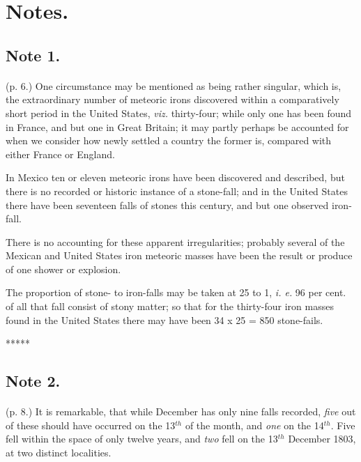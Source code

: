 \documentclass[a4paper, 12pt, oneside]{article}
\begin{document}
\section{Notes.}
\subsection{Note 1.}
\paragraph{}
(p. 6.) One circumstance may be mentioned as being rather singular, which is, the extraordinary number of meteoric irons discovered within a comparatively short period in the United States, \emph{viz.} thirty-four; while only one has been found in France, and but one in Great Britain; it may partly perhaps be accounted for when we consider how newly settled a country the former is, compared with either France or England.

In Mexico ten or eleven meteoric irons have been discovered and described, but there is no recorded or historic instance of a stone-fall; and in the United States there have been seventeen falls of stones this century, and but one observed iron-fall.

There is no accounting for these apparent irregularities; probably several of the Mexican and United States iron meteoric masses have been the result or produce of one shower or explosion.

The proportion of stone- to iron-falls may be taken at 25 to 1, \emph{i. e.} 96 per cent. of all that fall consist of stony matter; so that for the thirty-four iron masses found in the United States there may have been 34 x 25 = 850 stone-fails.

\centerline{*\hspace{15mm}*\hspace{15mm}*\hspace{15mm}*\hspace{15mm}*}
\bigskip

\subsection{Note 2.}
\paragraph{}
(p. 8.) It is remarkable, that while December has only nine falls recorded, \emph{five} out of these should have occurred on the 13$^{th}$ of the month, and \emph{one} on the 14$^{th}$. Five fell within the space of only twelve years, and \emph{two} fell on the 13$^{th}$ December 1803, at two distinct localities.
\end{document}

